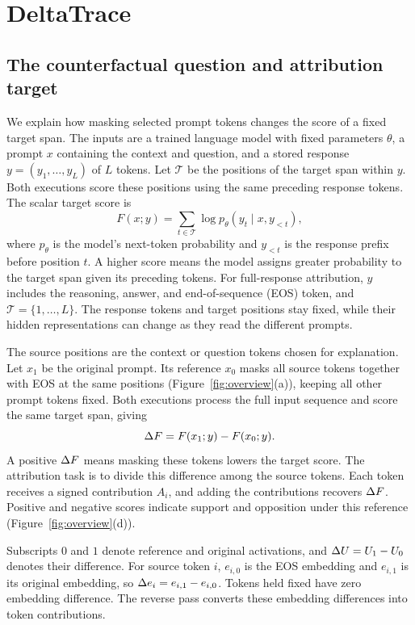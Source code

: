 \section{DeltaTrace}
\label{sec:method}

\subsection{The counterfactual question and attribution target}
We explain how masking selected prompt tokens changes the score of a fixed target span. The inputs are a trained language model with fixed parameters $\theta$, a prompt $x$ containing the context and question, and a stored response $y=(y_1,\ldots,y_L)$ of $L$ tokens. Let $\mathcal{T}$ be the positions of the target span within $y$. Both executions score these positions using the same preceding response tokens. The scalar target score is
\begin{equation}
F(x;y)=\sum_{t\in\mathcal{T}}\log p_\theta(y_t\mid x,y_{<t}),
\label{eq:target}
\end{equation}
where $p_\theta$ is the model's next-token probability and $y_{<t}$ is the response prefix before position $t$. A higher score means the model assigns greater probability to the target span given its preceding tokens. For full-response attribution, $y$ includes the reasoning, answer, and end-of-sequence (EOS) token, and $\mathcal{T}=\{1,\ldots,L\}$. The response tokens and target positions stay fixed, while their hidden representations can change as they read the different prompts.

The source positions are the context or question tokens chosen for explanation. Let $x_1$ be the original prompt. Its reference $x_0$ masks all source tokens together with EOS at the same positions (Figure~\ref{fig:overview}(a)), keeping all other prompt tokens fixed. Both executions process the full input sequence and score the same target span, giving
\[
\Delta F=F(x_1;y)-F(x_0;y).
\]
A positive $\Delta F$ means masking these tokens lowers the target score. The attribution task is to divide this difference among the source tokens. Each token receives a signed contribution $A_i$, and adding the contributions recovers $\Delta F$. Positive and negative scores indicate support and opposition under this reference (Figure~\ref{fig:overview}(d)).

Subscripts $0$ and $1$ denote reference and original activations, and $\Delta U=U_1-U_0$ denotes their difference. For source token $i$, $e_{i,0}$ is the EOS embedding and $e_{i,1}$ is its original embedding, so $\Delta e_i=e_{i,1}-e_{i,0}$. Tokens held fixed have zero embedding difference. The reverse pass converts these embedding differences into token contributions.


